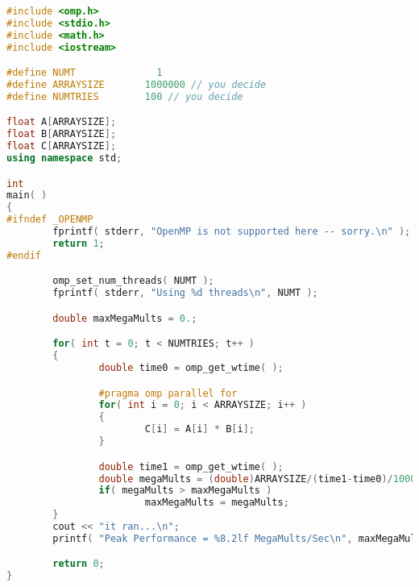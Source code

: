 \documentclass{article}
\begin{document}
\begin{lstlisting}[language=C++, caption={C++ code using listings}]
#include <omp.h>
#include <stdio.h>
#include <math.h>
#include <iostream>

#define NUMT	          1
#define ARRAYSIZE       1000000	// you decide
#define NUMTRIES        100	// you decide

float A[ARRAYSIZE];
float B[ARRAYSIZE];
float C[ARRAYSIZE];
using namespace std;

int
main( )
{
#ifndef _OPENMP
        fprintf( stderr, "OpenMP is not supported here -- sorry.\n" );
        return 1;
#endif

        omp_set_num_threads( NUMT );
        fprintf( stderr, "Using %d threads\n", NUMT );

        double maxMegaMults = 0.;

        for( int t = 0; t < NUMTRIES; t++ )
        {
                double time0 = omp_get_wtime( );

                #pragma omp parallel for
                for( int i = 0; i < ARRAYSIZE; i++ )
                {
                        C[i] = A[i] * B[i];
                }

                double time1 = omp_get_wtime( );
                double megaMults = (double)ARRAYSIZE/(time1-time0)/1000000.;
                if( megaMults > maxMegaMults )
                        maxMegaMults = megaMults;
        }
        cout << "it ran...\n";
        printf( "Peak Performance = %8.2lf MegaMults/Sec\n", maxMegaMults );

        return 0;
}
\end{lstlisting}
\end{document}
